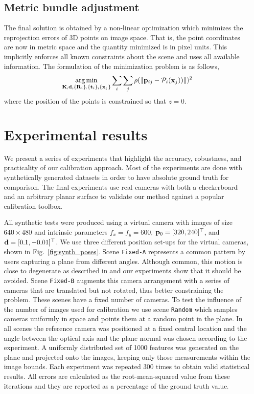 \documentclass[10pt,twocolumn,letterpaper]{article}
\begin{document}
\subsection{Metric bundle adjustment}

The final solution is obtained by a non-linear optimization which minimizes the reprojection errors of 3D points on image space. That is, the point coordinates are now in metric space and the quantity minimized is in pixel units. This implicitly enforces all known constraints about the scene and uses all available information. The formulation of the minimization problem is as follows, 
%
\begin{align}
\argmin_{\Km,\dv,\lbrace \Rm_i \rbrace,\lbrace \tv_i \rbrace, \lbrace \xv_j \rbrace} 
%
\sum_i \sum_j \rho(\norm{\pv_{ij} - \Projection_i(\xv_j))})^2 
\end{align}
%
where the position of the points is constrained so that $z=0$. 

\section{Experimental results}
\label{sec:results}

We present a series of experiments that highlight the accuracy, robustness, and practicality of our calibration approach. Most of the experiments are done with synthetically generated datasets in order to have absolute ground truth for comparison. The final experiments use real cameras with both a checkerboard and an arbitrary planar surface to validate our method against a popular calibration toolbox.

All synthetic tests were produced using a virtual camera with images of size $640 \times 480$ and intrinsic parameters $f_x=f_y=600$, $\mathbf{p}_0=[320,240]^\top$, and $\mathbf{d}=[0.1,-0.01]^\top$. We use three different position set-ups for the virtual cameras, shown in Fig.~\ref{fig:synth_poses}. Scene \texttt{Fixed-A} represents a common pattern by users capturing a plane from different angles. Although common, this motion is close to degenerate as described in \cite{sturm1997} and our experiments show that it should be avoided. Scene \texttt{Fixed-B} augments this camera arrangement with a series of cameras that are translated but not rotated, thus better constraining the problem. These scenes have a fixed number of cameras. To test the influence of the number of images used for calibration we use scene \texttt{Random} which samples cameras uniformly in space and points them at a random point in the plane. In all scenes the reference camera was positioned at a fixed central location and the angle between the optical axis and the plane normal was chosen according to the experiment. A uniformly distributed set of 1000 features was generated on the plane and projected onto the images, keeping only those measurements within the image bounds. Each experiment was repeated 300 times to obtain valid statistical results. All errors are calculated as the root-mean-squared value from these iterations and they are reported as a percentage of the ground truth value.
\end{document}
